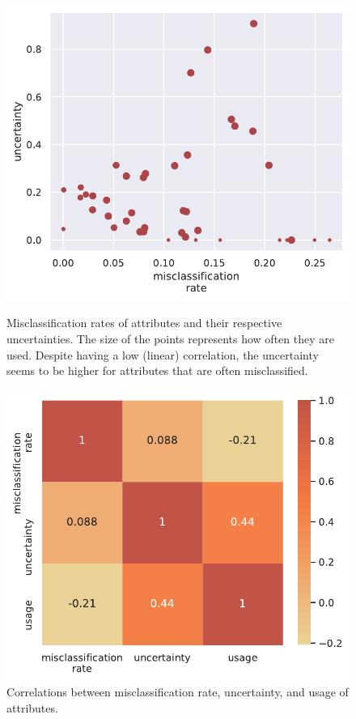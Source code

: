\documentclass[a4paper,cleardoubleempty,BCOR1cm, 11pt]{report}
\begin{document}
\begin{figure}
	\centering
	\begin{minipage}[t]{0.45\textwidth}
		\centering
		\includegraphics[width=1\textwidth]{images/error_sigma_corr_all.pdf} 
		\caption{Misclassification rates of attributes and their respective uncertainties. The size of the points represents how often they are used. Despite having a low (linear) correlation, the uncertainty seems to be higher for attributes that are often misclassified.}
		\label{fig:correlations}
	\end{minipage}\hfill
	\begin{minipage}[t]{0.45\textwidth}
		\centering
		\includegraphics[width=1\textwidth]{images/corr_matrix.pdf}
		\caption{Correlations between misclassification rate, uncertainty, and usage of attributes.}
		\label{fig:corr_matrix}
	\end{minipage}
\end{figure}
\end{document}
